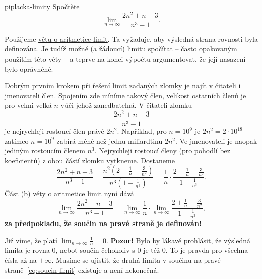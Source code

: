 \begin{problem}{}{piplacka-limity}
 Spočtěte
 \[
  \lim_{n \to \infty} \frac{2n^2+n-3}{n^3-1}.
 \]
\end{problem}
\begin{probsol}
 Použijeme \hyperref[thm:aritmetika-limit]{větu o aritmetice limit}. Ta
 vyžaduje, aby výsledná strana rovnosti byla definována. Je tudíž možné (a
 žádoucí) limitu spočítat -- často opakovaným použitím této věty -- a teprve na
 konci výpočtu argumentovat, že její nasazení bylo oprávněné.

 Dobrým prvním krokem při řešení limit zadaných zlomky je najít v čitateli i
 jmenovateli  člen. Spojením 
 zde míníme takový člen, velikost ostatních členů je pro velmi velká $n$ vůči
 jehož zanedbatelná. V čitateli zlomku
 \[
  \frac{2n^2 + n - 3}{n^3 - 1}
 \]
 je nejrychleji rostoucí člen právě $2n^2$. Například, pro $n = 10^9$ je $2n^2 =
 2 \cdot 10^{18}$ zatímco $n = 10^9$ zabírá méně než jednu miliardtinu $2n^2$.
 Ve jmenovateli je naopak jediným rostoucím členem $n^3$. Nejrychleji rostoucí
 členy (pro pohodlí bez koeficientů) z obou částí zlomku vytkneme. Dostaneme
 \[
  \frac{2n^2 + n - 3}{n^3 - 1} = \frac{n^2 \left( 2 + \frac{1}{n} -
  \frac{3}{n^2} \right)}{n^3 \left(1 - \frac{1}{n^3}\right)} = \frac{1}{n} \cdot
  \frac{2 + \frac{1}{n} - \frac{3}{n^2}}{1 - \frac{1}{n^3}}.
 \]
 Část (b) \hyperref[thm:aritmetika-limit]{věty o aritmetice limit} nyní dává
 \begin{equation*}
  \label{eq:soucin-limit}
  \tag{$\triangle$}
  \lim_{n \to \infty} \frac{2n^2 + n - 3}{n^3 - 1} = \lim_{n \to \infty}
  \frac{1}{n} \cdot \lim_{n \to \infty} \frac{2 + \frac{1}{n} - \frac{3}{n^2}}{1
  - \frac{1}{n^3}},
 \end{equation*}
 \textbf{za předpokladu, že součin na pravé straně je definován!}

 Již víme, že platí $\lim_{n \to \infty} \frac{1}{n} = 0$. \textbf{Pozor!} Bylo
 by lákavé prohlásit, že výsledná limita je rovna $0$, neboť součin čehokoliv s
 $0$ je též $0$. To je pravda pro všechna čísla až na $\pm \infty$. Musíme se
 ujistit, že druhá limita v součinu na pravé straně~\eqref{eq:soucin-limit}
 existuje a není nekonečná.


\end{probsol}
